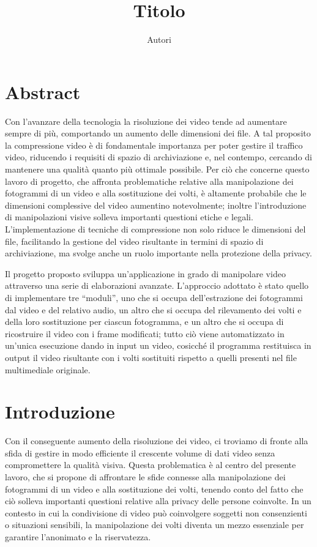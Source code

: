 \documentclass{report}
\title{Titolo}
\author{Autori}
\date{}
\begin{document}
\thispagestyle{empty}
\chapter*{Abstract}
Con l’avanzare della tecnologia la risoluzione dei video tende ad aumentare sempre di più, comportando un aumento delle dimensioni dei file. A tal proposito la compressione video è di fondamentale importanza per poter gestire il traffico video, riducendo i requisiti di spazio di archiviazione e, nel contempo, cercando di mantenere una qualità quanto più ottimale possibile. Per ciò che concerne questo lavoro di progetto, che affronta problematiche relative alla manipolazione dei fotogrammi di un video e alla sostituzione dei volti, è altamente probabile che le dimensioni complessive del video aumentino notevolmente; inoltre l’introduzione di manipolazioni visive solleva importanti questioni etiche e legali. L’implementazione di tecniche di compressione non solo riduce le dimensioni del file, facilitando la gestione del video risultante in termini di spazio di archiviazione, ma svolge anche un ruolo importante nella protezione della privacy.

Il progetto proposto sviluppa un’applicazione in grado di manipolare video attraverso una serie di elaborazioni avanzate. L’approccio adottato è stato quello di implementare tre “moduli”, uno che si occupa dell’estrazione dei fotogrammi dal video e del relativo audio, un altro che si occupa del rilevamento dei volti e della loro sostituzione per ciascun fotogramma, e un altro che si occupa di ricostruire il video con i frame modificati; tutto ciò viene automatizzato in un’unica esecuzione dando in input un video, cosicché il programma restituisca in output il video risultante con i volti sostituiti rispetto a quelli presenti nel file multimediale originale.


\thispagestyle{empty}
\tableofcontents
\thispagestyle{empty}

\chapter{Introduzione}

Con il conseguente aumento della risoluzione dei video, ci troviamo di fronte alla sfida di gestire in modo efficiente il crescente volume di dati video senza compromettere la qualità visiva. Questa problematica è al centro del presente lavoro, che si propone di affrontare le sfide connesse alla manipolazione dei fotogrammi di un video e alla sostituzione dei volti, tenendo conto del fatto che ciò solleva importanti questioni relative alla privacy delle persone coinvolte. In un contesto in cui la condivisione di video può coinvolgere soggetti non consenzienti o situazioni sensibili, la manipolazione dei volti diventa un mezzo essenziale per garantire l’anonimato e la riservatezza.
\end{document}
